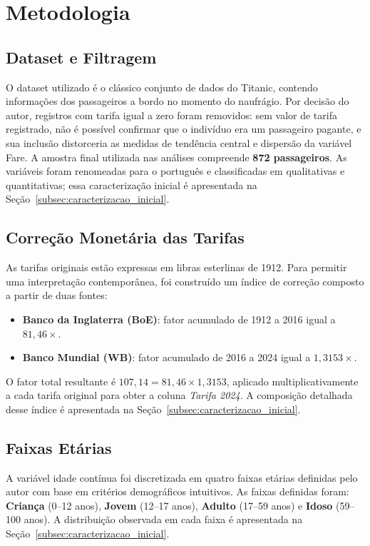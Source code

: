 \documentclass[conference]{IEEEtran}
\begin{document}
\section{Metodologia}

\subsection{Dataset e Filtragem}

O dataset utilizado é o clássico conjunto de dados do Titanic, contendo
informações dos passageiros a bordo no momento do naufrágio. Por decisão
do autor, registros com tarifa igual a zero foram removidos: sem valor de
tarifa registrado, não é possível confirmar que o indivíduo era um passageiro
pagante, e sua inclusão distorceria as medidas de tendência central e
dispersão da variável Fare. A amostra final utilizada nas análises compreende
\textbf{872 passageiros}. As variáveis foram renomeadas para o português e
classificadas em qualitativas e quantitativas; essa caracterização inicial é
apresentada na Seção~\ref{subsec:caracterizacao_inicial}.

\subsection{Correção Monetária das Tarifas}

As tarifas originais estão expressas em libras esterlinas de 1912. Para
permitir uma interpretação contemporânea, foi construído um índice de
correção composto a partir de duas fontes:

\begin{itemize}
  \item \textbf{Banco da Inglaterra (BoE)}: fator acumulado de 1912 a 2016
        igual a $81{,}46\times$.
  \item \textbf{Banco Mundial (WB)}: fator acumulado de 2016 a 2024 igual a
        $1{,}3153\times$.
\end{itemize}

O fator total resultante é $107{,}14 = 81{,}46 \times 1{,}3153$, aplicado
multiplicativamente a cada tarifa original para obter a coluna
\textit{Tarifa 2024}. A composição detalhada desse índice é apresentada na
Seção~\ref{subsec:caracterizacao_inicial}.

\subsection{Faixas Etárias}

A variável idade contínua foi discretizada em quatro faixas etárias
definidas pelo autor com base em critérios demográficos intuitivos. As
faixas definidas foram: \textbf{Criança} (0--12 anos), \textbf{Jovem}
(12--17 anos), \textbf{Adulto} (17--59 anos) e \textbf{Idoso}
(59--100 anos). A distribuição observada em cada faixa é apresentada na
Seção~\ref{subsec:caracterizacao_inicial}.
\end{document}
